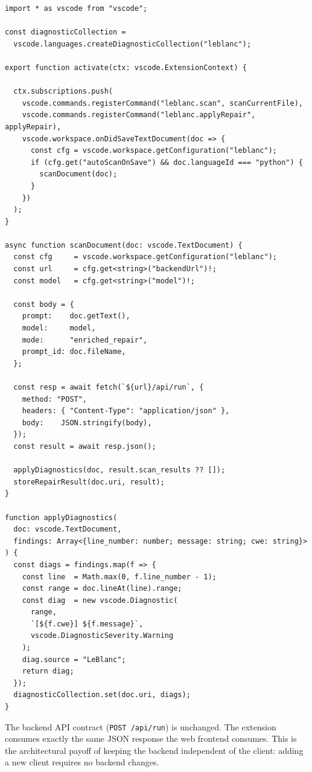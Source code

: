 \documentclass[12pt,a4paper]{report}
\begin{document}
\begin{lstlisting}[language={}, caption={Skeleton of \texttt{extension.ts}},
                   label={lst:extts}]
import * as vscode from "vscode";

const diagnosticCollection =
  vscode.languages.createDiagnosticCollection("leblanc");

export function activate(ctx: vscode.ExtensionContext) {

  ctx.subscriptions.push(
    vscode.commands.registerCommand("leblanc.scan", scanCurrentFile),
    vscode.commands.registerCommand("leblanc.applyRepair", applyRepair),
    vscode.workspace.onDidSaveTextDocument(doc => {
      const cfg = vscode.workspace.getConfiguration("leblanc");
      if (cfg.get("autoScanOnSave") && doc.languageId === "python") {
        scanDocument(doc);
      }
    })
  );
}

async function scanDocument(doc: vscode.TextDocument) {
  const cfg     = vscode.workspace.getConfiguration("leblanc");
  const url     = cfg.get<string>("backendUrl")!;
  const model   = cfg.get<string>("model")!;

  const body = {
    prompt:    doc.getText(),
    model:     model,
    mode:      "enriched_repair",
    prompt_id: doc.fileName,
  };

  const resp = await fetch(`${url}/api/run`, {
    method: "POST",
    headers: { "Content-Type": "application/json" },
    body:    JSON.stringify(body),
  });
  const result = await resp.json();

  applyDiagnostics(doc, result.scan_results ?? []);
  storeRepairResult(doc.uri, result);
}

function applyDiagnostics(
  doc: vscode.TextDocument,
  findings: Array<{line_number: number; message: string; cwe: string}>
) {
  const diags = findings.map(f => {
    const line  = Math.max(0, f.line_number - 1);
    const range = doc.lineAt(line).range;
    const diag  = new vscode.Diagnostic(
      range,
      `[${f.cwe}] ${f.message}`,
      vscode.DiagnosticSeverity.Warning
    );
    diag.source = "LeBlanc";
    return diag;
  });
  diagnosticCollection.set(doc.uri, diags);
}
\end{lstlisting}

The backend API contract (\texttt{POST /api/run}) is unchanged. The extension
consumes exactly the same JSON response the web frontend consumes. This is the
architectural payoff of keeping the backend independent of the client: adding a
new client requires no backend changes.
\end{document}
